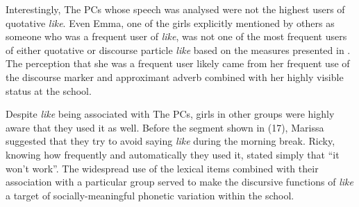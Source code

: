 \label{PCsuselike}
\vspace{5 mm}


\noindent Interestingly, The PCs whose speech was analysed were not the highest users of quotative \textit{like}. Even Emma, one of the girls explicitly mentioned by others as someone who was a frequent user of \textit{like}, was not one of the most frequent users of either quotative or discourse particle \textit{like} based on the measures presented in . The perception that she was a frequent user likely came from her frequent use of the discourse marker and approximant adverb combined with her highly visible status at the school. 

Despite \textit{like} being associated with The PCs, girls in other groups were highly aware that they used it as well. Before the segment shown in (17), Marissa suggested that they try to avoid saying \textit{like} during the morning break. Ricky, knowing how frequently and automatically they used it, stated simply that ``it won't work''. The widespread use of the lexical items combined with their association with a particular group served to make the discursive functions of \textit{like} a target of socially-meaningful phonetic variation within the school.





